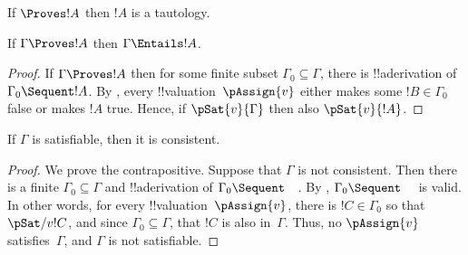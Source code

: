 \begin{cor}
If $\Proves !A$ then $!A$ is a tautology.
\end{cor}

\begin{cor}
If $\Gamma \Proves !A$ then $\Gamma \Entails !A$.
\end{cor}

\begin{proof}
If $\Gamma \Proves !A$ then for some finite subset $\Gamma_0 \subseteq
\Gamma$, there is !!a{derivation} of $\Gamma_0 \Sequent !A$.  By
, every
!!{valuation}~$\pAssign{v}$
either makes some $!B \in \Gamma_0$ false or makes $!A$ true.  Hence,
if $\pSat{v}{\Gamma}$ then also
$\pSat{v}{!A}$.
\end{proof}

\begin{cor}
If $\Gamma$ is satisfiable, then it is consistent.
\end{cor}

\begin{proof}
We prove the contrapositive.  Suppose that $\Gamma$ is not consistent.
Then there is a finite $\Gamma_0 \subseteq \Gamma$ and !!a{derivation}
of $\Gamma_0 \Sequent \quad$.  By ,
$\Gamma_0 \Sequent \quad$ is valid.  In other words, for every
!!{valuation}~$\pAssign{v}$,
there is $!C \in \Gamma_0$ so that
$\pSat/{v}{!C}$, and since $\Gamma_0
\subseteq \Gamma$, that $!C$ is also in~$\Gamma$.  Thus, no
$\pAssign{v}$ satisfies~$\Gamma$, and
$\Gamma$ is not satisfiable.
\end{proof}





\OLEndChapterHook





  

